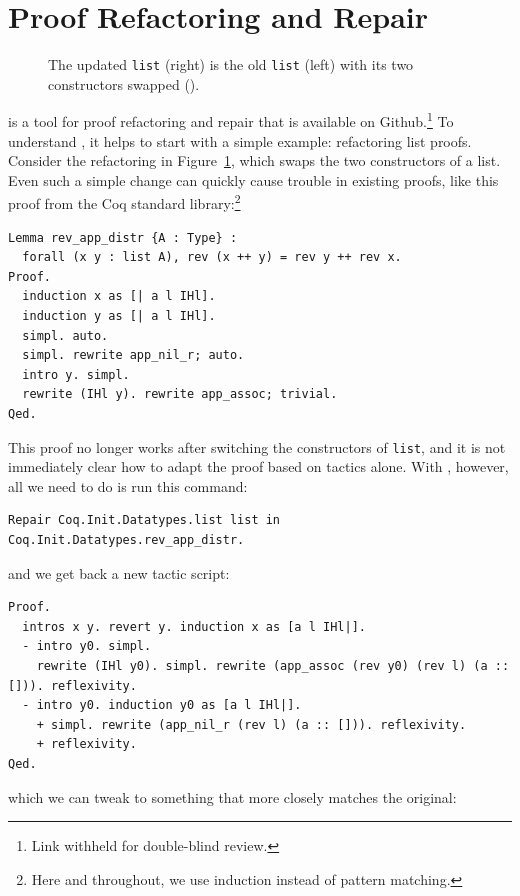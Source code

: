 \section{Proof Refactoring and Repair}
\label{sec:overview}

\begin{figure}
\begin{minipage}{0.46\textwidth}
   
\end{minipage}
\hfill
\begin{minipage}{0.46\textwidth}
   
\end{minipage}
\caption{The updated \lstinline{list} (right) is the old \lstinline{list} (left) with its two constructors swapped ().}
\label{fig:listswap}
\end{figure}

\toolname is a tool for proof refactoring and repair that is available on Github.\footnote{Link withheld for double-blind review.}
To understand \toolname, it helps to start with a simple example: refactoring list proofs.
Consider the refactoring in Figure~\ref{fig:listswap}, which swaps the two constructors of a list.
Even such a simple change can quickly cause trouble in existing proofs, like this proof from the Coq standard library:\footnote{Here and throughout, we use induction instead of pattern matching.}

\begin{lstlisting}
Lemma rev_app_distr {A : Type} :
  forall (x y : list A), rev (x ++ y) = rev y ++ rev x.
Proof.
  induction x as [| a l IHl].
  induction y as [| a l IHl].
  simpl. auto.
  simpl. rewrite app_nil_r; auto.
  intro y. simpl.
  rewrite (IHl y). rewrite app_assoc; trivial.
Qed.
\end{lstlisting}
This proof no longer works after switching the constructors of \lstinline{list},
and it is not immediately clear how to adapt the proof based on tactics alone.
With \toolname, however, all we need to do is run this command: %

\begin{lstlisting}
Repair Coq.Init.Datatypes.list list in Coq.Init.Datatypes.rev_app_distr.
\end{lstlisting}
and we get back a new tactic script:

\begin{lstlisting}
Proof.
  intros x y. revert y. induction x as [a l IHl|].
  - intro y0. simpl.
    rewrite (IHl y0). simpl. rewrite (app_assoc (rev y0) (rev l) (a :: [])). reflexivity.
  - intro y0. induction y0 as [a l IHl|].
    + simpl. rewrite (app_nil_r (rev l) (a :: [])). reflexivity.
    + reflexivity.
Qed.
\end{lstlisting}
which we can tweak to something that more closely matches the original:

